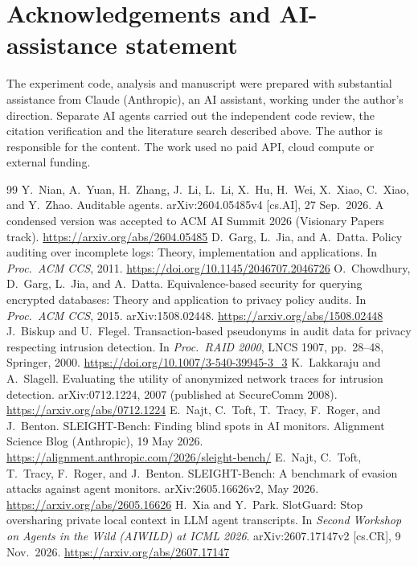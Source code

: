 \documentclass[11pt]{article}
\begin{document}
\section*{Acknowledgements and AI-assistance statement}

The experiment code, analysis and manuscript were prepared with substantial assistance from Claude (Anthropic), an AI assistant, working under the author's direction. Separate AI agents carried out the independent code review, the citation verification and the literature search described above. The author is responsible for the content. The work used no paid API, cloud compute or external funding.

\begin{thebibliography}{99}\small
{} Y.~Nian, A.~Yuan, H.~Zhang, J.~Li, L.~Li, X.~Hu, H.~Wei, X.~Xiao, C.~Xiao, and Y.~Zhao. Auditable agents. arXiv:2604.05485v4 [cs.AI], 27 Sep.\ 2026. A condensed version was accepted to ACM AI Summit 2026 (Visionary Papers track). \url{https://arxiv.org/abs/2604.05485}
 D.~Garg, L.~Jia, and A.~Datta. Policy auditing over incomplete logs: Theory, implementation and applications. In \emph{Proc.\ ACM CCS}, 2011. \url{https://doi.org/10.1145/2046707.2046726}
 O.~Chowdhury, D.~Garg, L.~Jia, and A.~Datta. Equivalence-based security for querying encrypted databases: Theory and application to privacy policy audits. In \emph{Proc.\ ACM CCS}, 2015. arXiv:1508.02448. \url{https://arxiv.org/abs/1508.02448}
 J.~Biskup and U.~Flegel. Transaction-based pseudonyms in audit data for privacy respecting intrusion detection. In \emph{Proc.\ RAID 2000}, LNCS 1907, pp.~28--48, Springer, 2000. \url{https://doi.org/10.1007/3-540-39945-3_3}
 K.~Lakkaraju and A.~Slagell. Evaluating the utility of anonymized network traces for intrusion detection. arXiv:0712.1224, 2007 (published at SecureComm 2008). \url{https://arxiv.org/abs/0712.1224}
 E.~Najt, C.~Toft, T.~Tracy, F.~Roger, and J.~Benton. SLEIGHT-Bench: Finding blind spots in AI monitors. Alignment Science Blog (Anthropic), 19 May 2026. \url{https://alignment.anthropic.com/2026/sleight-bench/}
 E.~Najt, C.~Toft, T.~Tracy, F.~Roger, and J.~Benton. SLEIGHT-Bench: A benchmark of evasion attacks against agent monitors. arXiv:2605.16626v2, May 2026. \url{https://arxiv.org/abs/2605.16626}
 H.~Xia and Y.~Park. SlotGuard: Stop oversharing private local context in LLM agent transcripts. In \emph{Second Workshop on Agents in the Wild (AIWILD) at ICML 2026}. arXiv:2607.17147v2 [cs.CR], 9 Nov.\ 2026. \url{https://arxiv.org/abs/2607.17147}

\end{thebibliography}
\end{document}
